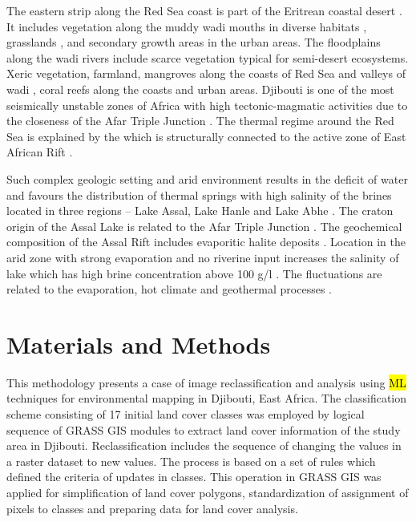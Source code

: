 \documentclass[jimaging,article,submit,pdftex,moreauthors]{Definitions/mdpi}
\begin{document}
The eastern strip along the Red Sea coast is part of the Eritrean coastal desert \cite{TESFAI2021104327}. It includes vegetation along the muddy wadi mouths in diverse habitats \cite{MEDIN201526}, grasslands \cite{ALI20231,IDOWU2020e00402}, and secondary growth areas in the urban areas. The floodplains along the wadi rivers include scarce vegetation typical for semi-desert ecosystems. Xeric vegetation, farmland, mangroves along the coasts of Red Sea and valleys of wadi \cite{BLANCOSACRISTAN2022157098,BEYIN2024100247}, coral reefs along the coasts \cite{Klaus2015,COWBURN2019182,GAPPER2024e38249} and urban areas.{ }Djibouti is one of the most{ seismically unstable }zones of Africa {with high} tectonic-magmatic activities \cite{Chandrasekharam,MOUSSA2023104765,AYELE2024105236,JALLUDIN1994237} due to the closeness of the Afar Triple Junction \cite{RIME2023104519,GIDAFIE2024102037,DARRAH201316}. The thermal regime around the Red Sea{ }is explained by the {which }is structurally connected to the active{ }zone of East African Rift \cite{Varet2022,Lemenkova202206,PINZUTI2010169,Lemenkova202205,MESHESHA2021e08634}. 

{Such }complex geologic setting and arid environment {results in the} deficit of water {and favours} the distribution of thermal springs with high salinity of the brines located in three regions -- Lake Assal, Lake Hanle and Lake Abhe \cite{MOLOGNI2021107896,DAMORE1998197}. The craton origin of the Assal Lake{ }is related to the Afar Triple Junction \cite{HOUSSEIN2010220,AWALEH2024102894,Houssein02112014}. The {geochemical composition of the} Assal Rift {includes }evaporitic halite deposits \cite{CASTANIER1992811,GASSE198967}. Location in the arid zone with strong evaporation and no riverine input increases {the} salinity {of lake }which has high brine concentration above 100 g/l \cite{DEKOV2021120126}. The fluctuations are related to the evaporation, hot climate and geothermal processes \cite{ZAN1990561}. 


\section{Materials and Methods}
This methodology presents a case of image reclassification and analysis using \hl{ML} techniques{ }for environmental mapping in Djibouti, East Africa. The classification scheme consisting of 17 initial land cover classes was employed by logical sequence of GRASS GIS modules to extract land cover information of the study area in Djibouti. {Reclassification includes the sequence of changing the values in a raster dataset to new values. The process is based on a set of rules which defined the criteria of updates in classes. This operation in GRASS GIS was applied for simplification of land cover polygons, standardization of assignment of pixels to classes and preparing data for land cover analysis.}
\end{document}
